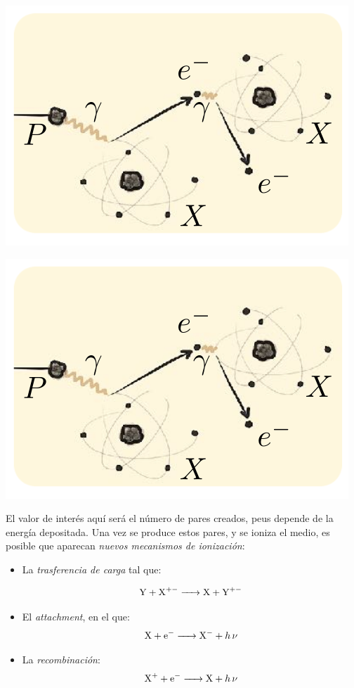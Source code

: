 \begin{minipage}{0.45\linewidth} \centering
    \includegraphics[width=0.9\linewidth]{Cuerpo/Ch_01/Detectores_01.png}
\end{minipage}
\hfill
\begin{minipage}{0.45\linewidth} \centering
    \includegraphics[width=0.9\linewidth]{Cuerpo/Ch_01/Detectores_01.png}
\end{minipage}




El valor de interés aquí será el número de pares creados, peus depende de  la energía depositada. Una vez se produce estos pares, y se ioniza el medio, es posible que aparecan \textit{nuevos mecanismos de ionización}: 

\begin{itemize}
    \item La \textit{trasferencia de carga} tal que:

    \[ \ce{ Y + X^+- -> X + Y^+-} \]

    \item El \textit{attachment}, en el que:
    \[ \ce{X + e- -> X^- + h \nu} \]

    \item La \textit{recombinación}: 
    \[ \ce{X^+ + e- -> X + h \nu} \]
\end{itemize}

